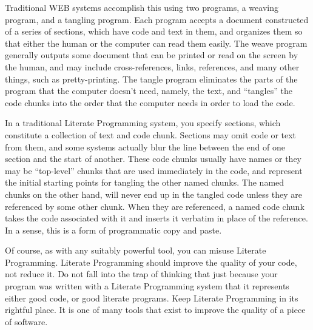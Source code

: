 Traditional WEB systems accomplish this using two programs, a
weaving program, and a tangling program.  Each program accepts a
document constructed of a series of sections, which have code and text
in them, and organizes them so that either the human or the computer
can read them easily.  The weave program generally outputs some
document that can be printed or read on the screen by the human, and
may include cross-references, links, references, and many other
things, such as pretty-printing.  The tangle program eliminates the
parts of the program that the computer doesn't need, namely, the text,
and ``tangles'' the code chunks into the order that the computer needs
in order to load the code.

In a traditional Literate Programming system, you specify sections,
which constitute a collection of text and code chunk.  Sections may
omit code or text from them, and some systems actually blur the line
between the end of one section and the start of another.  These code
chunks usually have names or they may be ``top-level'' chunks that are
used immediately in the code, and represent the initial starting
points for tangling the other named chunks.  The named chunks on the
other hand, will never end up in the tangled code unless they are
referenced by some other chunk.  When they are referenced, a named
code chunk takes the code associated with it and inserts it verbatim
in place of the reference.  In a sense, this is a form of programmatic
copy and paste.

Of course, as with any suitably powerful tool, you can misuse Literate
Programming.  Literate Programming should improve the quality of your
code, not reduce it.  Do not fall into the trap of thinking that just
because your program was written with a Literate Programming system
that it represents either good code, or good literate programs.  Keep
Literate Programming in its rightful place.  It is one of many tools
that exist to improve the quality of a piece of software.

